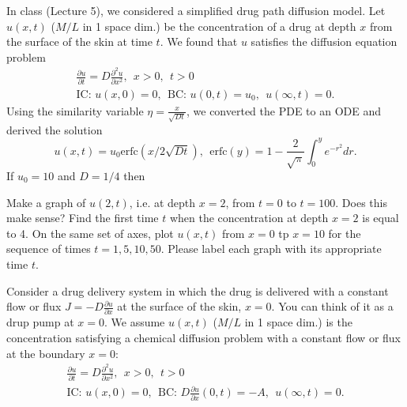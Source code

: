 \documentclass[
	number={3},
	title={}
]{math486homework}
\begin{document}
\maketitle

\begin{problems}
	\problem In class (Lecture 5), we considered a simplified drug path diffusion model.
	Let $u(x,t)$ ($M/L$ in 1 space dim.) be the concentration of a drug at depth $x$ from the surface of the skin at time $t$.
	We found that $u$ satisfies the diffusion equation problem
	\begin{equation*}
	\begin{aligned}
		\frac{\partial u}{\partial t} = D\frac{\partial^{2} u}{\partial x^{2}},\ \ x > 0,\ \ t > 0\\
		\mbox{IC: } u(x, 0) = 0,\ \ \mbox{BC: } u(0, t) = u_{0},\ \ u(\infty, t) = 0.
	\end{aligned}
	\end{equation*}
	Using the similarity variable $\eta = \frac{x}{\sqrt{Dt}}$, we converted the PDE to an ODE and derived the solution
	\begin{equation}
		u(x,t) = u_{0}\mbox{erfc}\left( x / 2\sqrt{Dt} \right),\ \ \mbox{erfc}(y) = 1 - \frac{2}{\sqrt{\pi}}\int_{0}^{y} e^{-r^{2}}dr.
		\label{eq:3.1}
	\end{equation}
	If $u_{0} = 10$ and $D = 1/4$ then
	\begin{problems}
		\subproblem Make a graph of $u(2,t)$, i.e. at depth $x=2$, from $t=0$ to $t=100$.
		Does this make sense? 
		\subproblem Find the first time $t$ when the concentration at depth $x=2$ is equal to 4. 
		\subproblem On the same set of axes, plot $u(x,t)$ from $x=0$ tp $x=10$ for the sequence of times $t=1, 5, 10, 50$.
		Please label each graph with its appropriate time $t$. 
	\end{problems}
	\problem Consider a drug delivery system in which the drug is delivered with a constant flow or flux $J = -D\frac{\partial u}{\partial x}$ at the surface of the skin, $x=0$.
	You can think of it as a drup pump at $x=0$.
	We assume $u(x,t)$ ($M/L$ in 1 space dim.) is the concentration satisfying a chemical diffusion problem with a constant flow or flux at the boundary $x=0$:
	\begin{equation*}
		\begin{aligned}
			\frac{\partial u}{\partial t} = D\frac{\partial^{2} u}{\partial x^{2}},\ \ x > 0,\ \ t > 0\\
			\mbox{IC: } u(x, 0) = 0,\ \ \mbox{BC: } D\frac{\partial u}{\partial x}(0, t) = -A,\ \ u(\infty, t)=0.
		\end{aligned}
	\end{equation*}


\end{problems}
\end{document}
